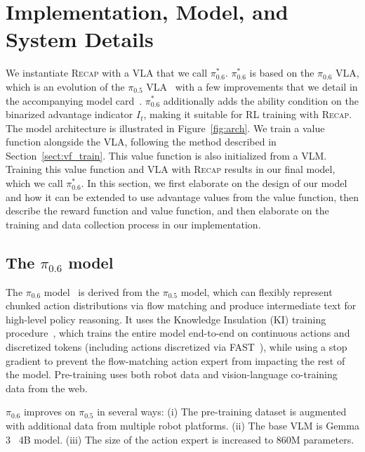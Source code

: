 \documentclass[conference]{IEEEtran}
\def \Pizf {$\pi_{0.5}$}
\def \Pizs {$\pi_{0.6}$}
\def \ModelSymbol {$\pi^{*}_{0.6}$}
\def \MethodName {\textsc{Recap}}
\begin{document}
\section{Implementation, Model, and System Details}
\label{sect:system}

We instantiate \MethodName{} with a VLA that we call \ModelSymbol{}. \ModelSymbol{} is based on the \Pizs{} VLA, which is an evolution of the \Pizf{} VLA~\citep{black2025pi05} with a few improvements that we detail in the accompanying model card~\citep{pi06model}. \ModelSymbol{} additionally adds the ability condition on the binarized advantage indicator $I_t$, making it suitable for RL training with \MethodName{}. The model architecture is illustrated in Figure~\ref{fig:arch}. We train a value function alongside the VLA, following the method described in Section~\ref{sect:vf_train}. This value function is also initialized from a VLM. Training this value function and VLA with \MethodName{} results in our final model, which we call \ModelSymbol{}. In this section, we first elaborate on the design of our model and how it can be extended to use advantage values from the value function, then describe the reward function and value function, and then elaborate on the training and data collection process in our implementation.



\subsection{The \Pizs{} model}
\label{sect:pi06}

The \Pizs{} model~\citep{pi06model} is derived from the \Pizf{} model, which can flexibly represent chunked action distributions via flow matching and produce intermediate text for high-level policy reasoning. It uses the Knowledge Insulation (KI) training procedure~\citep{driess2025knowledge}, which trains the entire model end-to-end on continuous actions and discretized tokens (including actions discretized via FAST~\citep{pertsch2025fast}), while using a stop gradient to prevent the flow-matching action expert from impacting the rest of the model. Pre-training uses both robot data and vision-language co-training data from the web.

\Pizs{} improves on \Pizf{} in several ways: (i) The pre-training dataset is augmented with additional data from multiple robot platforms. (ii) The base VLM is Gemma 3~\citep{gemmateam2025gemma3technicalreport} 4B model. (iii) The size of the action expert is increased to 860M parameters.
\end{document}
